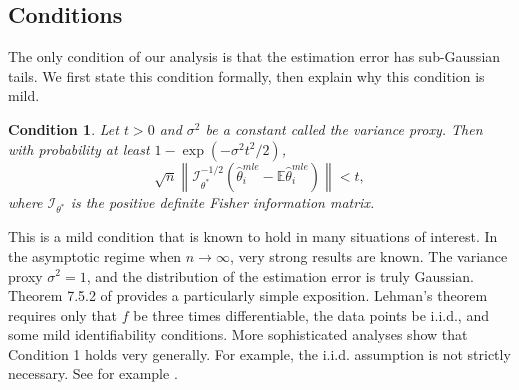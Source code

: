 \documentclass[twoside]{article}
\newtheorem{assumption}{Condition}
\newcommand{\E}{\mathbb{E}}
\newcommand{\w}{\theta}
\newcommand{\wmle}{\hat\w^{mle}}
\newcommand{\wstar}{{\w^{*}}}
\newcommand{\I}{\mathcal I}
\newcommand{\ltwo}[1]{{\lVert {#1} \rVert}}
\newcommand{\ltwobig}[1]{{\left\lVert {#1} \right\rVert}}
\newcommand{\prob}[1]{\Pr\left[{#1}\right]}
\begin{document}
\subsection{Conditions}

The only condition of our analysis is that the estimation error has sub-Gaussian tails.
We first state this condition formally,
then explain why this condition is mild.

%

\begin{assumption}
Let $t>0$ and $\sigma^2$ be a constant called the \emph{variance proxy}.
Then with probability at least $1-\exp(-\sigma^2t^2/2)$,
\begin{equation}
\sqrt n \ltwobig{\I^{-1/2}_\wstar(\wmle_i-\E\wmle_i)} < t
,
\end{equation}
where $\I_\wstar$ is the positive definite Fisher information matrix.
\end{assumption}

This is a mild condition that is known to hold in many situations of interest.
In the asymptotic regime when $n\to\infty$,
very strong results are known.
The variance proxy $\sigma^2=1$,
and the distribution of the estimation error is truly Gaussian.
Theorem 7.5.2 of \cite{lehmann1999elements} provides a particularly simple exposition.
Lehman's theorem requires only that $f$ be three times differentiable,
the data points be i.i.d.,
and some mild identifiability conditions.
More sophisticated analyses show that Condition 1 holds very generally.
For example, the i.i.d. assumption is not strictly necessary.
See for example \cite{spokoiny2012parametricestimation}.
\end{document}
